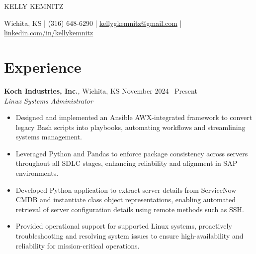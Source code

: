 \documentclass[10pt]{article}       %
\begin{document}
\centerline{\Huge KELLY KEMNITZ}

\vspace{5pt}

\centerline{\large Wichita, KS | (316) 648-6290 | \href{mailto:kellygkemnitz@gmail.com}{kellygkemnitz@gmail.com} | \href{https://www.linkedin.com/in/kellykemnitz/}{linkedin.com/in/kellykemnitz}}

\vspace{-10pt}

\section*{Experience}
\textbf{Koch Industries, Inc.}, Wichita, KS \hfill November 2024 \textendash\ Present \\
\vspace{1pt}
\textit{Linux Systems Administrator} \\
\vspace{-6.5pt}
\begin{itemize}
  \item Designed and implemented an Ansible AWX-integrated framework to convert legacy Bash scripts into playbooks, automating workflows and streamlining systems management.
  \item Leveraged Python and Pandas to enforce package consistency across servers throughout all SDLC stages, enhancing reliability and alignment in SAP environments.
  \item Developed Python application to extract server details from ServiceNow CMDB and instantiate class object representations, enabling automated retrieval of server configuration details using remote methods such as SSH.
  \item Provided operational support for supported Linux systems, proactively troubleshooting and resolving system issues to ensure high-availability and reliability for mission-critical operations.
\end{itemize}
\end{document}
